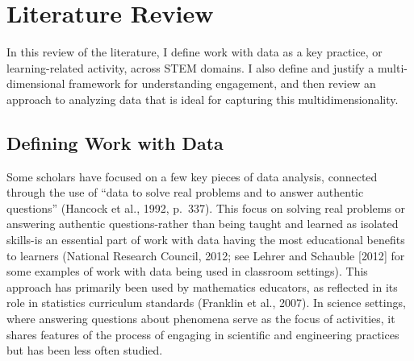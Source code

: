 \documentclass[]{msu-thesis}
\theoremstyle{definition}
\theoremstyle{definition}
\theoremstyle{definition}
\theoremstyle{remark}
\begin{document}
\chapter{Literature Review}\label{literature-review}

In this review of the literature, I define work with data as a key
practice, or learning-related activity, across STEM domains. I also
define and justify a multi-dimensional framework for understanding
engagement, and then review an approach to analyzing data that is ideal
for capturing this multidimensionality.

\section{Defining Work with Data}\label{defining-work-with-data}

Some scholars have focused on a few key pieces of data analysis,
connected through the use of ``data to solve real problems and to answer
authentic questions'' (Hancock et al., 1992, p.~337). This focus on
solving real problems or answering authentic questions-rather than being
taught and learned as isolated skills-is an essential part of work with
data having the most educational benefits to learners (National Research
Council, 2012; see Lehrer and Schauble {[}2012{]} for some examples of
work with data being used in classroom settings). This approach has
primarily been used by mathematics educators, as reflected in its role
in statistics curriculum standards (Franklin et al., 2007). In science
settings, where answering questions about phenomena serve as the focus
of activities, it shares features of the process of engaging in
scientific and engineering practices but has been less often studied.
\end{document}

